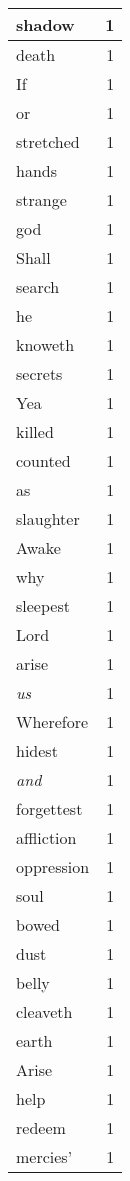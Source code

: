 \begin{center}
\begin{longtable}{l|r}
shadow & 1 \\ \hline
death & 1 \\ \hline
If & 1 \\ \hline
or & 1 \\ \hline
stretched & 1 \\ \hline
hands & 1 \\ \hline
strange & 1 \\ \hline
god & 1 \\ \hline
Shall & 1 \\ \hline
search & 1 \\ \hline
he & 1 \\ \hline
knoweth & 1 \\ \hline
secrets & 1 \\ \hline
Yea & 1 \\ \hline
killed & 1 \\ \hline
counted & 1 \\ \hline
as & 1 \\ \hline
slaughter & 1 \\ \hline
Awake & 1 \\ \hline
why & 1 \\ \hline
sleepest & 1 \\ \hline
Lord & 1 \\ \hline
arise & 1 \\ \hline
\emph{us} & 1 \\ \hline
Wherefore & 1 \\ \hline
hidest & 1 \\ \hline
\emph{and} & 1 \\ \hline
forgettest & 1 \\ \hline
affliction & 1 \\ \hline
oppression & 1 \\ \hline
soul & 1 \\ \hline
bowed & 1 \\ \hline
dust & 1 \\ \hline
belly & 1 \\ \hline
cleaveth & 1 \\ \hline
earth & 1 \\ \hline
Arise & 1 \\ \hline
help & 1 \\ \hline
redeem & 1 \\ \hline
mercies' & 1 \\ \hline
\end{longtable}
\end{center}



